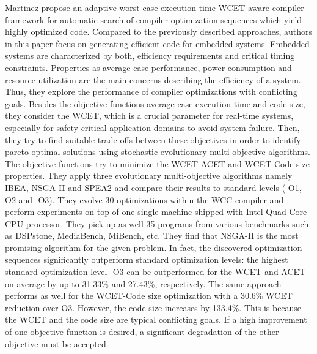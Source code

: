 Martinez \etal\cite{martinez2014multi} propose an adaptive worst-case execution time WCET-aware compiler framework for automatic search of compiler optimization sequences which yield highly optimized code. 
Compared to the previously described approaches, authors in this paper focus on generating efficient code for embedded systems. Embedded systems are characterized by both, efficiency requirements and critical timing constraints. Properties as average-case performance, power consumption and resource utilization are the main concerns describing the efficiency of a system. 
Thus, they explore the performance of compiler optimizations with conflicting goals. 
Besides the objective functions average-case execution time and code size, they consider the WCET, which is a crucial parameter for real-time systems, especially for safety-critical application domains to avoid system failure.
Then, they try to find suitable trade-offs between these objectives in order to identify pareto optimal solutions using stochastic evolutionary multi-objective algorithms. The objective functions try to minimize the WCET-ACET and WCET-Code size properties. They apply three evolutionary multi-objective algorithms namely IBEA, NSGA-II and SPEA2 and compare their results to standard levels (-O1, -O2 and -O3). 
They evolve 30 optimizations within the WCC compiler and perform experiments on top of one single machine shipped with Intel Quad-Core CPU processor. They pick up as well 35  programs from various benchmarks such as DSPstone, MediaBench, MiBench, etc.
They find that NSGA-II is the most promising algorithm for the given problem. In fact, the discovered optimization sequences significantly outperform standard optimization levels:
the highest standard optimization level -O3 can be outperformed for the WCET and ACET on average by up to 31.33\% and 27.43\%, respectively. The same approach performs as well for the WCET-Code size optimization with a 30.6\% WCET reduction over O3. However, the code size increases by 133.4\%. This is because the WCET and the code size are typical conflicting goals. If a high improvement of one objective function is desired, a significant degradation of the other objective must be accepted.

